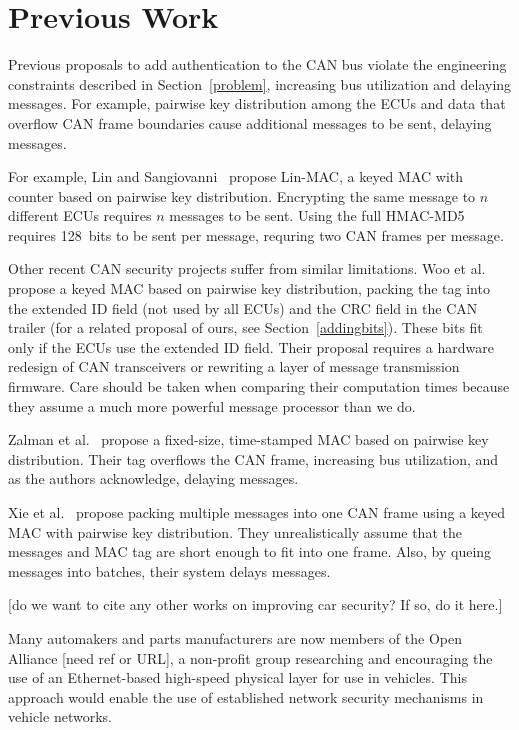 \section{Previous Work}
\label{previous}

Previous proposals to add authentication to the CAN bus violate the engineering constraints described
in Section~\ref{problem}, increasing bus utilization and delaying messages.  For example, pairwise
key distribution among the ECUs and data that overflow CAN frame boundaries cause additional messages to be sent,
delaying messages.

For example, Lin and Sangiovanni~\cite{Lin-MAC} propose Lin-MAC, a keyed MAC with counter based on
pairwise key distribution.  Encrypting the same message to $n$ different ECUs requires $n$
messages to be sent.   Using the full HMAC-MD5 requires 128~bits to be sent per message, requring two CAN frames per message.

Other recent CAN security projects suffer from similar limitations. 
Woo et al.~\cite{Woo-14} propose a keyed MAC based on pairwise key distribution,
packing the tag into the extended ID field (not used by all ECUs) and the CRC field in the CAN trailer
(for a related proposal of ours, see Section~\ref{addingbits}). 
These bits fit only if the ECUs use the extended ID field. 
Their proposal requires a hardware redesign of CAN transceivers or rewriting a layer of message transmission firmware.
Care should be taken when comparing their computation times because
they assume a much more powerful message processor than we do. 


Zalman et al.~\cite{Zalman-14} propose a fixed-size, time-stamped MAC based on pairwise key distribution.
Their tag overflows the CAN frame, increasing bus utilization, and as the authors acknowledge,
delaying messages.

Xie et al.~\cite{Xie-15} propose packing multiple messages into one CAN frame using a keyed MAC with 
pairwise key distribution.   They unrealistically assume that the messages and MAC tag are short
enough to fit into one frame.  Also, by queing messages into batches, their system delays messages.

[do we want to cite any other works on improving car security? If so, do it here.]

Many automakers and parts manufacturers are now members of the Open Alliance [need ref or URL], 
a non-profit group researching and encouraging the use of an Ethernet-based high-speed physical layer 
for use in vehicles.  This approach would enable the use of 
established network security mechanisms in vehicle networks.

